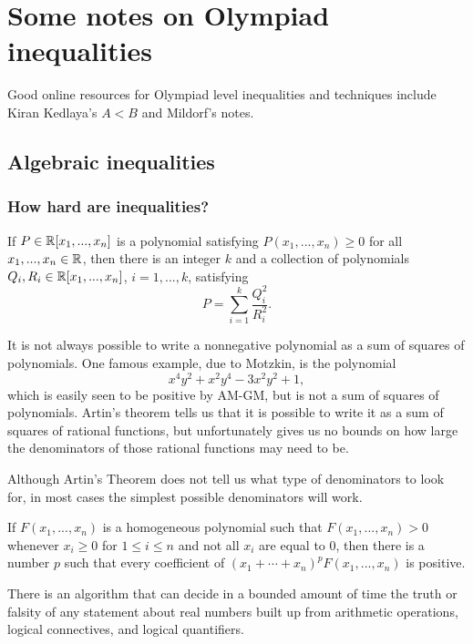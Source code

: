 \section{Some notes on Olympiad inequalities}

Good online resources for Olympiad level inequalities and techniques include Kiran Kedlaya's $A < B$ and Mildorf's notes.

\subsection{Algebraic inequalities}

\subsubsection{How hard are inequalities?}

\begin{thm}[Artin] If $P\in \mathbb{R}[x_1, ..., x_n]$ is a polynomial satisfying $P(x_1, ..., x_n) \ge 0$ for all $x_1, ..., x_n \in \mathbb{R}$, then there is an integer $k$ and a collection of polynomials $Q_i, R_i \in \mathbb{R}[x_1, ..., x_n]$, $i = 1, ..., k$, satisfying
\[
P = \sum_{i=1}^k \frac{Q_i^2}{R_i^2}.
\]
\end{thm}

\begin{rem} It is not always possible to write a nonnegative polynomial as a sum of squares of polynomials. One famous example, due to Motzkin, is the polynomial
\[
x^4y^2 + x^2y^4 - 3x^2y^2 + 1,
\]
which is easily seen to be positive by AM-GM, but is not a sum of squares of polynomials. Artin's theorem tells us that it is possible to write it as a sum of squares of rational functions, but unfortunately gives us no bounds on how large the denominators of those rational functions may need to be.
\end{rem}

Although Artin's Theorem does not tell us what type of denominators to look for, in most cases the simplest possible denominators will work.

\begin{thm}[Polya] If $F(x_1, ..., x_n)$ is a homogeneous polynomial such that $F(x_1, ..., x_n) > 0$ whenever $x_i \ge 0$ for $1\le i \le n$ and not all $x_i$ are equal to $0$, then there is a number $p$ such that every coefficient of $(x_1+\cdots +x_n)^pF(x_1, ..., x_n)$ is positive.
\end{thm}

\begin{thm}[Tarski] There is an algorithm that can decide in a bounded amount of time the truth or falsity of any statement about real numbers built up from arithmetic operations, logical connectives, and logical quantifiers.
\end{thm}

